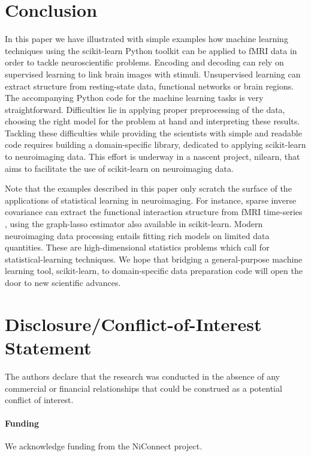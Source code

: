 \documentclass{frontiersSCNS} %
\begin{document}
\section{Conclusion}

In this paper we have illustrated with simple examples how machine
learning techniques using the scikit-learn Python toolkit can be applied
to fMRI data in order to tackle
neuroscientific problems. Encoding and decoding can rely on supervised
learning to link brain images with stimuli. Unsupervised learning
can extract structure from resting-state data, functional networks or
brain regions. The accompanying Python code for the machine learning
tasks is very straightforward. Difficulties lie in applying proper 
preprocessing of the data, choosing the right model for the problem at
hand and interpreting these results. Tackling these difficulties while
providing the scientists with simple and readable code requires building
a domain-specific library, dedicated to applying scikit-learn to
neuroimaging data. This effort is underway in a nascent project, nilearn,
that aims to facilitate the use of scikit-learn on neuroimaging data.

Note that the examples described in this paper only scratch the
surface of the applications of statistical learning in neuroimaging. For
instance, sparse inverse covariance can extract the functional 
interaction structure from fMRI time-series \citep{varoquaux2013}, using
the graph-lasso estimator also available in scikit-learn.
Modern neuroimaging data processing entails fitting rich models on
limited data quantities. These are high-dimensional statistics problems
which call
for statistical-learning techniques. We hope that bridging a
general-purpose machine learning tool, scikit-learn, to domain-specific
data preparation code will open the door to new scientific advances.


\section*{Disclosure/Conflict-of-Interest Statement}
The authors declare that the research was conducted in the absence of any
commercial or financial relationships that could be construed as a potential
conflict of interest.

\paragraph{Funding\textcolon} We acknowledge funding from the NiConnect project.


\end{document}
